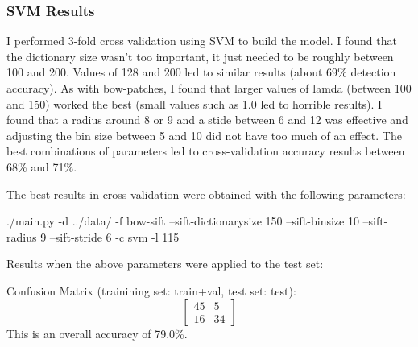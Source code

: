 \documentclass[fleqn]{article}
\begin{document}
\subsubsection{SVM Results}
I performed 3-fold cross validation using SVM to build the model.  I found that the dictionary size wasn't too important, it just needed to be roughly between 100 and 200.  Values of 128 and 200 led to similar results (about 69\% detection accuracy).  As with bow-patches, I found that larger values of lamda (between 100 and 150) worked the best (small values such as 1.0 led to horrible results).  I found that a radius around 8 or 9 and a stide between 6 and 12 was effective and adjusting the bin size between 5 and 10 did not have too much of an effect.  The best combinations of parameters led to cross-validation accuracy results between 68\% and 71\%.

The best results in cross-validation were obtained with the following parameters:
\begin{solution}
    ./main.py -d ../data/ -f bow-sift --sift-dictionarysize 150 --sift-binsize 10 --sift-radius 9 --sift-stride 6 -c svm -l 115
\end{solution}
Results when the above parameters were applied to the test set:

Confusion Matrix (trainining set: train+val, test set: test):
\[
  \begin{bmatrix}
    45 & 5 \\
    16 & 34
  \end{bmatrix}
\]
This is an overall accuracy of 79.0\%.
\end{document}
